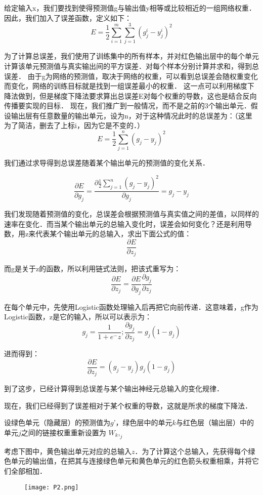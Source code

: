 给定输入x，我们要找到使得预测值g与输出值y相等或比较相近的一组网络权重．因此，我们加入了误差函数，定义如下：
$$ E = \frac{1}{2} \sum_{i=1}^m\sum_{j=1}^3 (g_j^i-y_j^i)^2$$

为了计算总误差，我们使用了训练集中的所有样本，并对红色输出层中的每个单元计算该单元预测值与真实输出间的平方误差．对每个样本分别计算并求和，得到总误差．
由于g为网络的预测值，取决于网络的权重，可以看到总误差会随权重变化而变化，网络的训练目标就是找到一组误差最小的权重．
这一点可以利用梯度下降法做到，但是梯度下降法要求算出总误差E对每个权重的导数，这也是结合反向传播要实现的目标．
现在，我们推广到一般情况，而不是之前的3个输出单元．假设输出层有任意数量的输出单元，设为n，对于这种情况此时的总误差为：（这里为了简洁，删去了上标i，因为它是不变的．）
$$ E = \frac{1}{2} \sum_{j=1}^n (g_j-y_j)^2$$

我们通过求导得到总误差随着某个输出单元的预测值的变化关系．

$$ \frac{\partial E}{\partial g_j} = \frac{\partial \frac{1}{2}\sum_{j=1}^n (g_j-y_j)^2}{\partial g_j} =g_j-y_j$$

我们发现随着预测值的变化，总误差会根据预测值与真实值之间的差值，以同样的速率在变化．而当某个输出单元的总输入变化时，误差会如何变化？还是利用导数，用z来代表某个输出单元的总输入，求出下面公式的值：
$$ \frac{\partial E}{\partial z_j}$$

而g是关于z的函数，所以利用链式法则，把该式重写为：
$$ \frac{\partial E}{\partial z_j}= \frac{\partial E}{\partial g_j} \frac{\partial g_j}{\partial z_j}$$

在每个单元中，先使用Logistic函数处理输入后再把它向前传递．这意味着，g作为Logistic函数，z是它的输入，所以可以表示为：
$$g_j=\frac{1}{1+e^-z};\frac{\partial g_j}{\partial z_j}=g_j(1-g_j)$$

进而得到：
$$\frac{\partial E}{\partial z_j}=(g_j-y_j)g_j(1-g_j)$$

到了这步，已经计算得到总误差与某个输出神经元总输入的变化规律．

现在，我们已经得到了误差相对于某个权重的导数，这就是所求的梯度下降法．　

设绿色单元（隐藏层）的预测值为$g’$，绿色层中的单元$k$与红色层（输出层）中的单元$j$之间的链接权重重新设置为 $W_k,_j$

考虑下图中，黄色输出单元对应的总输入$z$．为了计算这个总输入，先获得每个绿色单元的输出值，在把其与连接绿色单元和黄色单元的红色箭头权重相乘，并将它们全部相加．
\begin{figure}[htbp]
	\centering
	\texttt{[image: P2.png]}
	\label{figl1}
\end{figure}

